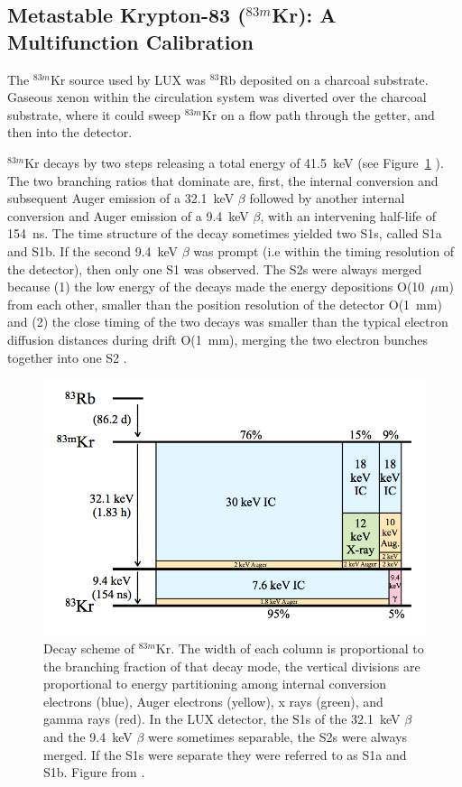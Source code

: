 \subsection{Metastable Krypton-83 ($^{83m}$Kr): A Multifunction Calibration}
\label{sec:krypton}
The $^{83m}$Kr source used by \ac{LUX} was $^{83}$Rb deposited on a charcoal substrate. Gaseous xenon within the circulation system was diverted over the charcoal substrate, where it could sweep $^{83m}$Kr on a flow path through the getter, and then into the detector. 

$^{83m}$Kr decays by two steps releasing a total energy of 41.5~keV (see Figure~\ref{fig:kr_decay} ). The two branching ratios that dominate are, first, the internal conversion and subsequent Auger emission of a 32.1~keV $\beta$ followed by another internal conversion and Auger emission of a 9.4~keV $\beta$, with an intervening half-life of 154~ns. The time structure of the decay sometimes yielded two S1s, called S1a and S1b. If the second 9.4~keV $\beta$ was prompt (i.e within the timing resolution of the detector), then only one S1 was observed. The S2s were always merged because (1) the low energy of the decays made the energy depositions O(10~$\mu$m) from each other, smaller than the position resolution of the detector O(1~mm) and (2) the close timing of the two decays was smaller than the typical electron diffusion distances during drift O(1~mm), merging the two electron bunches together into one S2 \cite{LUXKr}.

\begin{figure}[htbp]
\begin{center}
\includegraphics[width=\textwidth]{figures/lux/kr_decay.png}
\caption{ Decay scheme of $^{83m}$Kr. The width of each column is proportional to the branching fraction of that decay mode, the vertical divisions are proportional to energy partitioning among internal conversion electrons (blue), Auger electrons (yellow), x rays (green), and gamma rays (red). In the \acs{LUX} detector, the S1s of the 32.1~keV $\beta$ and the 9.4~keV $\beta$ were sometimes separable, the S2s were always merged. If the S1s were separate they were referred to as S1a and S1b. Figure from \cite{LUXKr}.}
\label{fig:kr_decay}
\end{center}
\end{figure}

